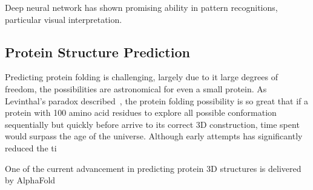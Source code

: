 Deep neural network has shown promising ability in pattern recognitions, particular visual interpretation.
\par 

\subsection{Protein Structure Prediction}
Predicting protein folding is challenging, largely due to it large degrees of freedom, the possibilities are astronomical for even a small protein. As Levinthal's paradox described~\cite{LEV69}, the protein folding possibility is so great that if a protein with 100 amino acid residues to explore all possible conformation sequentially but quickly before arrive to its correct 3D construction, time spent would surpass the age of the universe. Although early attempts has significantly reduced the ti 
\par 
One of the current advancement in predicting protein 3D structures is delivered by AlphaFold